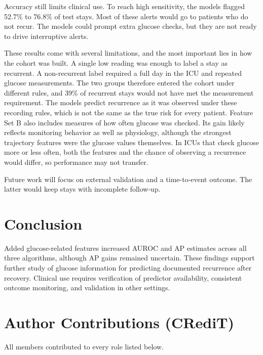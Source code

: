 \documentclass[twocolumn, 8pt]{article}
\begin{document}
Accuracy still limits clinical use. To reach high sensitivity, the models flagged 52.7\% to 76.8\% of test stays. Most of these alerts would go to patients who do not recur. The models could prompt extra glucose checks, but they are not ready to drive interruptive alerts.

These results come with several limitations, and the most important lies in how the cohort was built. A single low reading was enough to label a stay as recurrent. A non-recurrent label required a full day in the ICU and repeated glucose measurements. The two groups therefore entered the cohort under different rules, and 39\% of recurrent stays would not have met the measurement requirement. The models predict recurrence as it was observed under these recording rules, which is not the same as the true risk for every patient. Feature Set B also includes measures of how often glucose was checked. Its gain likely reflects monitoring behavior as well as physiology, although the strongest trajectory features were the glucose values themselves. In ICUs that check glucose more or less often, both the features and the chance of observing a recurrence would differ, so performance may not transfer.

Future work will focus on external validation and a time-to-event outcome. The latter would keep stays with incomplete follow-up.


\section{Conclusion}
\label{sec:conclusion}

Added glucose-related features increased AUROC and AP estimates across all three algorithms, although AP gains remained uncertain. These findings support further study of glucose information for predicting documented recurrence after recovery. Clinical use requires verification of predictor availability, consistent outcome monitoring, and validation in other settings.


\section*{Author Contributions (CRediT)}

All members contributed to every role listed below.
\end{document}
